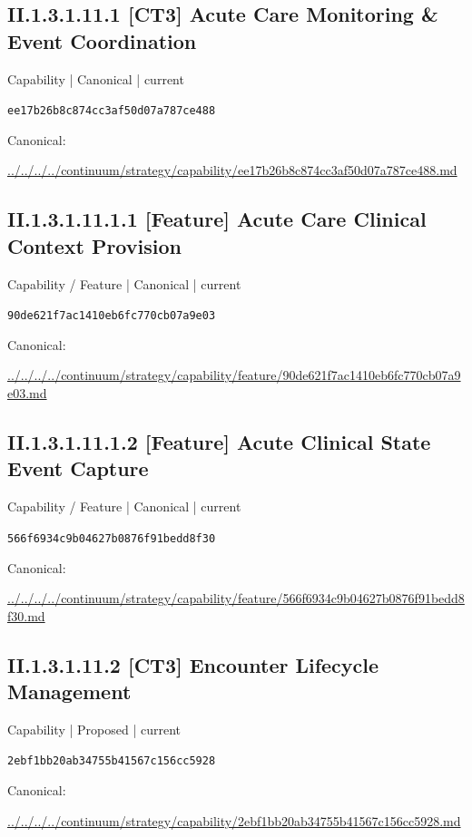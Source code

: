 \documentclass[10pt,a4paper]{article}
\begin{document}
\subsection*{II.1.3.1.11.1 [CT3] Acute Care Monitoring \& Event Coordination}
{\small Capability | Canonical | current}\par
\texttt{ee17b26b8c874cc3af50d07a787ce488}\par
Canonical: \par
{\footnotesize\url{../../../../continuum/strategy/capability/ee17b26b8c874cc3af50d07a787ce488.md}}\par
\subsection*{II.1.3.1.11.1.1 [Feature] Acute Care Clinical Context Provision}
{\small Capability / Feature | Canonical | current}\par
\texttt{90de621f7ac1410eb6fc770cb07a9e03}\par
Canonical: \par
{\footnotesize\url{../../../../continuum/strategy/capability/feature/90de621f7ac1410eb6fc770cb07a9e03.md}}\par
\subsection*{II.1.3.1.11.1.2 [Feature] Acute Clinical State Event Capture}
{\small Capability / Feature | Canonical | current}\par
\texttt{566f6934c9b04627b0876f91bedd8f30}\par
Canonical: \par
{\footnotesize\url{../../../../continuum/strategy/capability/feature/566f6934c9b04627b0876f91bedd8f30.md}}\par
\subsection*{II.1.3.1.11.2 [CT3] Encounter Lifecycle Management}
{\small Capability | Proposed | current}\par
\texttt{2ebf1bb20ab34755b41567c156cc5928}\par
Canonical: \par
{\footnotesize\url{../../../../continuum/strategy/capability/2ebf1bb20ab34755b41567c156cc5928.md}}\par
\end{document}
